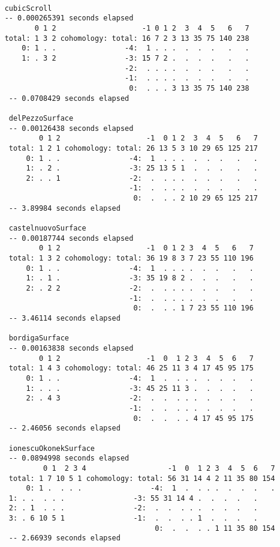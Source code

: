 \documentclass[twoside,12pt, leqno]{amsart}
\begin{document}
\begin{verbatim}

    cubicScroll
    -- 0.000265391 seconds elapsed
           0 1 2                    -1 0 1 2  3  4  5   6   7
    total: 1 3 2 cohomology: total: 16 7 2 3 13 35 75 140 238
        0: 1 . .                -4:  1 . . .  .  .  .   .   .
        1: . 3 2                -3: 15 7 2 .  .  .  .   .   .
                                -2:  . . . .  .  .  .   .   .
                                -1:  . . . .  .  .  .   .   .
                                 0:  . . . 3 13 35 75 140 238
     -- 0.0708429 seconds elapsed

     delPezzoSurface
     -- 0.00126438 seconds elapsed
            0 1 2                    -1  0 1 2  3  4  5   6   7
     total: 1 2 1 cohomology: total: 26 13 5 3 10 29 65 125 217
         0: 1 . .                -4:  1  . . .  .  .  .   .   .
         1: . 2 .                -3: 25 13 5 1  .  .  .   .   .
         2: . . 1                -2:  .  . . .  .  .  .   .   .
                                 -1:  .  . . .  .  .  .   .   .
                                  0:  .  . . 2 10 29 65 125 217
     -- 3.89984 seconds elapsed

     castelnuovoSurface
     -- 0.00187744 seconds elapsed
            0 1 2                    -1  0 1 2 3  4  5   6   7
     total: 1 3 2 cohomology: total: 36 19 8 3 7 23 55 110 196
         0: 1 . .                -4:  1  . . . .  .  .   .   .
         1: . 1 .                -3: 35 19 8 2 .  .  .   .   .
         2: . 2 2                -2:  .  . . . .  .  .   .   .
                                 -1:  .  . . . .  .  .   .   .
                                  0:  .  . . 1 7 23 55 110 196
     -- 3.46114 seconds elapsed

     bordigaSurface
     -- 0.00163838 seconds elapsed
            0 1 2                    -1  0  1 2 3  4  5  6   7
     total: 1 4 3 cohomology: total: 46 25 11 3 4 17 45 95 175
         0: 1 . .                -4:  1  .  . . .  .  .  .   .
         1: . . .                -3: 45 25 11 3 .  .  .  .   .
         2: . 4 3                -2:  .  .  . . .  .  .  .   .
                                 -1:  .  .  . . .  .  .  .   .
                                  0:  .  .  . . 4 17 45 95 175
     -- 2.46056 seconds elapsed

     ionescuOkonekSurface
     -- 0.0894998 seconds elapsed
             0 1  2 3 4                   -1  0  1 2 3  4  5  6   7
     total: 1 7 10 5 1 cohomology: total: 56 31 14 4 2 11 35 80 154
         0: 1 .  . . .                -4:  1  .  . . .  .  .  .   .
	 1: . .  . . .                -3: 55 31 14 4 .  .  .  .   .
	 2: . 1  . . .                -2:  .  .  . . .  .  .  .   .
	 3: . 6 10 5 1                -1:  .  .  . . 1  .  .  .   .
                                       0:  .  .  . . 1 11 35 80 154
     -- 2.66939 seconds elapsed


\end{verbatim}
\end{document}
